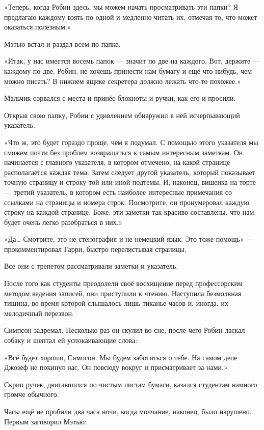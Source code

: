 \documentclass[a5paper, 9pt,
final, openany, twoside=true]{memoir}
\begin{document}
«Теперь, когда Робин здесь, мы можем начать просматривать эти папки? Я предлагаю каждому взять по одной и медленно читать их, отмечая то, что может оказаться полезным.»

Мэтью встал и раздал всем по папке.

«Итак, у нас имеется восемь папок — значит по две на каждого. Вот, держите — каждому по две. Робин, не хочешь принести нам бумагу и ещё что-нибудь, чем можно писать? В нижнем ящике секретера должно лежать что-то похожее.»

Мальчик сорвался с места и принёс блокноты и ручки, как его и просили.

Открыв свою папку, Робин с удивлением обнаружил в ней исчерпывающий указатель.

«Что ж, это будет гораздо проще, чем я подумал. С помощью этого указателя мы сможем почти без проблем возвращаться к самым интересным заметкам. Он начинается с главного указателя, в котором отмечено, на какой странице располагается каждая тема. Затем следует другой указатель, который показывает точную страницу и строку той или иной подтемы. И, наконец, вишенка на торте — третий указатель, в котором есть наиболее интересные примечания со ссылками на страницы и номера строк. Посмотрите, он пронумеровал каждую строку на каждой странице. Боже, эти заметки так красиво составлены, что нам будет очень легко разобраться в них.»

«Да… Смотрите, это не стенография и не немецкий язык. Это тоже помощь» — прокомментировал Гарри, быстро перелистывая страницы.\bigskip

Все они с трепетом рассматривали заметки и указатель.

После того как студенты преодолели своё восхищение перед профессорским методом ведения записей, они приступили к чтению. Наступила безмолвная тишина, во время которой слышалось лишь тиканье часов и, иногда, их мелодичный перезвон.\bigskip

Симпсон задремал. Несколько раз он скулил во сне, после чего Робин ласкал собаку и шептал ей успокаивающие слова:

«Всё будет хорошо, Симпсон. Мы будем заботиться о тебе. На самом деле Джозеф не покинул нас. Он повсюду вокруг и присматривает за нами.»\bigskip

Скрип ручек, двигавшихся по чистым листам бумаги, казался студентам намного громче обычного.

Часы ещё не пробили два часа ночи, когда молчание, наконец, было нарушено. Первым заговорил Мэтью:
\end{document}
